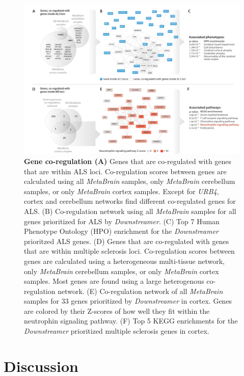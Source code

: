 \begin{figure}[H]
	\includegraphics[width=\textwidth]{chapters/chapter5-brain-eqtls/img/2021-02-11-fig7-ALSPrioritizedCoreGenes-v2.pdf}
	\caption{\textbf{Gene co-regulation (A)} Genes that are co-regulated with genes that are within ALS loci. Co-regulation scores between genes are calculated using all \textit{MetaBrain} samples, only \textit{MetaBrain} cerebellum samples, or only \textit{MetaBrain} cortex samples. Except for \textit{URB4}, cortex and cerebellum networks find different co-regulated genes for ALS. (B) Co-regulation network using all \textit{MetaBrain} samples for all genes prioritized for ALS by \textit{Downstreamer}. (C) Top 7 Human Phenotype Ontology (HPO) enrichment for the \textit{Downstreamer} prioritzed ALS genes. (D) Genes that are co-regulated with genes that are within multiple sclerosis loci. Co-regulation scores between genes are calculated using a heterogeneous multi-tissue network, only \textit{MetaBrain} cerebellum samples, or only \textit{MetaBrain} cortex samples. Most genes are found using a large heterogenous co-regulation network. (E) Co-regulation network of all \textit{MetaBrain} samples for 33 genes prioritized by \textit{Downstreamer} in cortex. Genes are colored by their Z-scores of how well they fit within the neutrophin signaling pathway. (F) Top 5 KEGG enrichments for the \textit{Downstreamer }prioritized multiple sclerosis genes in cortex.}
	\label{metabrain_fig7}
\end{figure}

\section{Discussion}


